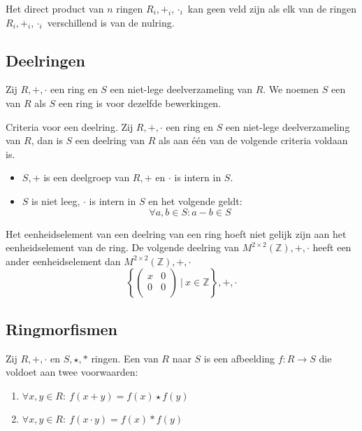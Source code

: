 \documentclass[main.tex]{subfiles}
\begin{document}
\begin{st}
  Het direct product van $n$ ringen $R_{i},+_{i},\cdot_{i}$ kan geen veld zijn als elk van de ringen $R_{i},+_{i},\cdot_{i}$ verschillend is van de nulring.
\end{st}

\subsection{Deelringen}
\label{sec:deelringen}

\begin{de}
  Zij $R,+,\cdot$ een ring en $S$ een niet-lege deelverzameling van $R$.
  We noemen $S$ een  van $R$ als $S$ een ring is voor dezelfde bewerkingen.
\end{de}

\begin{st}
  \label{st:deelring-criteria}
  Criteria voor een deelring.
  Zij $R,+,\cdot$ een ring en $S$ een niet-lege deelverzameling van $R$, dan is $S$ een deelring van $R$ als aan \'e\'en van de volgende criteria voldaan is.
  \begin{itemize}
  \item $S,+$ is een deelgroep van $R,+$ en $\cdot$ is intern in $S$.
  \item $S$ is niet leeg, $\cdot$ is intern in $S$ en het volgende geldt:
    \[ \forall a,b \in S: a - b \in S \]
  \end{itemize}
\end{st}

\begin{opm}
  Het eenheidselement van een deelring van een ring hoeft niet gelijk zijn aan het eenheidselement van de ring.
  De volgende deelring van $M^{2\times 2}(\mathbb{Z}),+,\cdot$ heeft een ander eenheidselement dan $M^{2\times 2}(\mathbb{Z}),+,\cdot$ 
  \[
  \left\{
    \begin{pmatrix}
      x & 0\\
      0 & 0\\
    \end{pmatrix}
  \ |\ x \in \mathbb{Z}
  \right\},+,\cdot
  \]
\end{opm}


\subsection{Ringmorfismen}
\label{sec:ringmorfismen}

\begin{de}
  Zij $R,+,\cdot$ en $S,\star,*$ ringen.
  Een  van $R$ naar $S$ is een afbeelding $f: R\rightarrow S$ die voldoet aan twee voorwaarden:
  \begin{enumerate}
  \item $\forall x,y \in R:\ f(x + y) = f(x) \star f(y)$
  \item $\forall x,y \in R:\ f(x \cdot y) = f(x) * f(y)$
  \end{enumerate}
\end{de}
\end{document}
